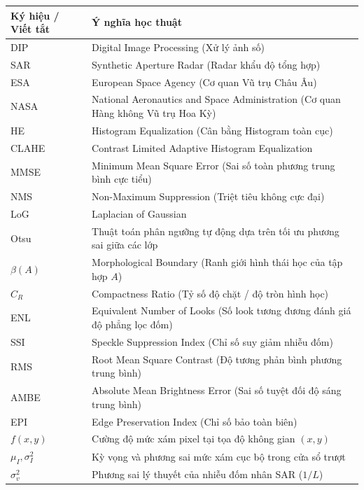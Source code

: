 \documentclass[12pt,a4paper]{report}
\begin{document}
\begin{table}[H]
\centering
\begin{tabularx}{\textwidth}{lX}
\toprule
\textbf{Ký hiệu / Viết tắt} & \textbf{Ý nghĩa học thuật} \\
\midrule
DIP & Digital Image Processing (Xử lý ảnh số) \\
SAR & Synthetic Aperture Radar (Radar khẩu độ tổng hợp) \\
ESA & European Space Agency (Cơ quan Vũ trụ Châu Âu) \\
NASA & National Aeronautics and Space Administration (Cơ quan Hàng không Vũ trụ Hoa Kỳ) \\
HE & Histogram Equalization (Cân bằng Histogram toàn cục) \\
CLAHE & Contrast Limited Adaptive Histogram Equalization \\
MMSE & Minimum Mean Square Error (Sai số toàn phương trung bình cực tiểu) \\
NMS & Non-Maximum Suppression (Triệt tiêu không cực đại) \\
LoG & Laplacian of Gaussian \\
Otsu & Thuật toán phân ngưỡng tự động dựa trên tối ưu phương sai giữa các lớp \\
$\beta(A)$ & Morphological Boundary (Ranh giới hình thái học của tập hợp $A$) \\
$C_R$ & Compactness Ratio (Tỷ số độ chặt / độ tròn hình học) \\
ENL & Equivalent Number of Looks (Số look tương đương đánh giá độ phẳng lọc đốm) \\
SSI & Speckle Suppression Index (Chỉ số suy giảm nhiễu đốm) \\
RMS & Root Mean Square Contrast (Độ tương phản bình phương trung bình) \\
AMBE & Absolute Mean Brightness Error (Sai số tuyệt đối độ sáng trung bình) \\
EPI & Edge Preservation Index (Chỉ số bảo toàn biên) \\
$f(x, y)$ & Cường độ mức xám pixel tại tọa độ không gian $(x, y)$ \\
$\mu_I, \sigma_I^2$ & Kỳ vọng và phương sai mức xám cục bộ trong cửa sổ trượt \\
$\sigma_v^2$ & Phương sai lý thuyết của nhiễu đốm nhân SAR ($1/L$) \\
\bottomrule
\end{tabularx}
\end{table}

\newpage
\tableofcontents

\newpage
\listoffigures

\newpage
\listoftables

\newpage
{}






% 

\newpage


\end{document}
